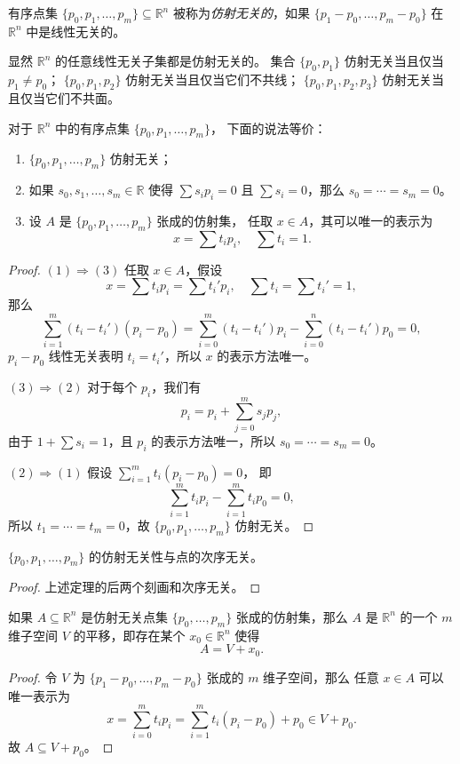\documentclass[fontset=none]{Notes}
\begin{document}
\begin{definition}
  有序点集 $\{p_0,p_1,\dots,p_m\}\subseteq \mathbb{R}^n$
  被称为\emph{仿射无关的}，如果 $\{p_1-p_0,\dots,p_m-p_0\}$
  在 $\mathbb{R}^n$ 中是线性无关的。
\end{definition}

显然 $\mathbb{R}^n$ 的任意线性无关子集都是仿射无关的。
集合 $\{p_0,p_1\}$ 仿射无关当且仅当 $p_1\neq p_0$；
$\{p_0,p_1,p_2\}$ 仿射无关当且仅当它们不共线；
$\{p_0,p_1,p_2,p_3\}$ 仿射无关当且仅当它们不共面。

\begin{theorem}
  对于 $\mathbb{R}^n$ 中的有序点集 $\{p_0,p_1,\dots,p_m\}$，
  下面的说法等价：
  \begin{enumerate}
    \item $\{p_0,p_1,\dots,p_m\}$ 仿射无关；
    \item 如果 $s_0,s_1,\dots,s_m\in \mathbb{R}$ 使得
    $\sum s_ip_i=0$ 且 $\sum s_i=0$，那么 $s_0=\cdots=s_m=0$。
    \item 设 $A$ 是 $\{p_0,p_1,\dots,p_m\}$ 张成的仿射集，
    任取 $x\in A$，其可以唯一的表示为
    \[
      x=\sum t_ip_i,\quad \sum t_i=1.
    \]
  \end{enumerate}
\end{theorem}
\begin{proof}
  $(1)\Rightarrow (3)$ 任取 $x\in A$，假设
  \[
    x=\sum t_i p_i=\sum t_i'p_i, \quad \sum t_i=\sum t_i'=1,
  \]
  那么
  \[
    \sum_{i=1}^m (t_i-t_i')(p_i-p_0)
    =\sum_{i=0}^m (t_i-t_i')p_i-\sum_{i=0}^n(t_i-t_i')p_0
    =0,
  \]
  $p_i-p_0$ 线性无关表明 $t_i=t_i'$，所以 $x$ 的表示方法唯一。

  $(3)\Rightarrow (2)$ 对于每个 $p_i$，我们有
  \[
    p_i=p_i+\sum_{j=0}^m s_jp_j,
  \]
  由于 $1+\sum s_i=1$，且 $p_i$ 的表示方法唯一，所以
  $s_0=\cdots=s_m=0$。

  $(2)\Rightarrow (1)$ 假设 $\sum_{i=1}^m t_i(p_i-p_0)=0$，
  即
  \[
    \sum_{i=1}^m t_ip_i-\sum_{i=1}^m t_ip_0=0,
  \]
  所以 $t_1=\cdots=t_m=0$，故 $\{p_0,p_1,\dots,p_m\}$ 仿射无关。
\end{proof}

\begin{corollary}
  $\{p_0,p_1,\dots,p_m\}$ 的仿射无关性与点的次序无关。
\end{corollary}
\begin{proof}
  上述定理的后两个刻画和次序无关。
\end{proof}

\begin{corollary}
  如果 $A\subseteq \mathbb{R}^n$ 是仿射无关点集 $\{p_0,\dots,p_m\}$ 
  张成的仿射集，那么 $A$ 是 $\mathbb{R}^n$ 的一个 $m$ 维子空间 $V$
  的平移，即存在某个 $x_0\in \mathbb{R}^n$ 使得
  \[
    A=V+x_0.
  \]
\end{corollary}
\begin{proof}
  令 $V$ 为 $\{p_1-p_0,\dots,p_m-p_0\}$ 张成的 $m$ 维子空间，那么
  任意 $x\in A$ 可以唯一表示为
  \[
    x=\sum_{i=0}^m t_ip_i=\sum_{i=1}^m t_i(p_i-p_0)+p_0\in V+ p_0.
  \]
  故 $A\subseteq V+p_0$。
\end{proof}
\end{document}
